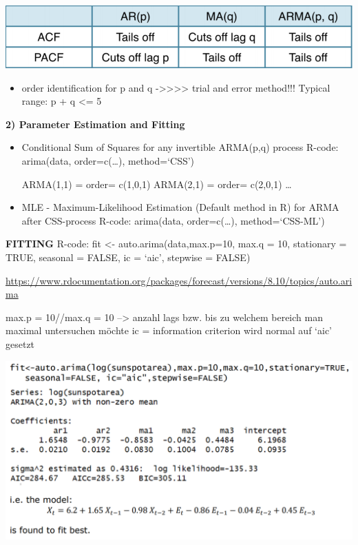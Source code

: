 \documentclass[
]{article}
\providecommand{\tightlist}{%
  \setlength{\itemsep}{0pt}\setlength{\parskip}{0pt}}
\begin{document}
\includegraphics[width=1\linewidth]{ident}

\begin{itemize}
\tightlist
\item
  order identification for p and q
  -\textgreater\textgreater\textgreater\textgreater{} trial and error
  method!!! Typical range: p + q \textless= 5
\end{itemize}

\textbf{2) Parameter Estimation and Fitting}

\begin{itemize}
\item
  Conditional Sum of Squares for any invertible ARMA(p,q) process
  R-code: arima(data, order=c(\ldots), method=`CSS')

  ARMA(1,1) = order= c(1,0,1) ARMA(2,1) = order= c(2,0,1) \ldots{}
\item
  MLE - Maximum-Likelihood Estimation (Default method in R) for ARMA
  after CSS-process R-code: arima(data, order=c(\ldots),
  method=`CSS-ML')
\end{itemize}

\textbf{FITTING} R-code: fit \textless- auto.arima(data,max.p=10, max.q
= 10, stationary = TRUE, seasonal = FALSE, ic = `aic', stepwise = FALSE)

\url{https://www.rdocumentation.org/packages/forecast/versions/8.10/topics/auto.arima}

max.p = 10//max.q = 10 --\textgreater{} anzahl lags bzw. bis zu welchem
bereich man maximal untersuchen möchte ic = information criterion wird
normal auf `aic' gesetzt

\includegraphics[width=1\linewidth]{fit}
\end{document}
